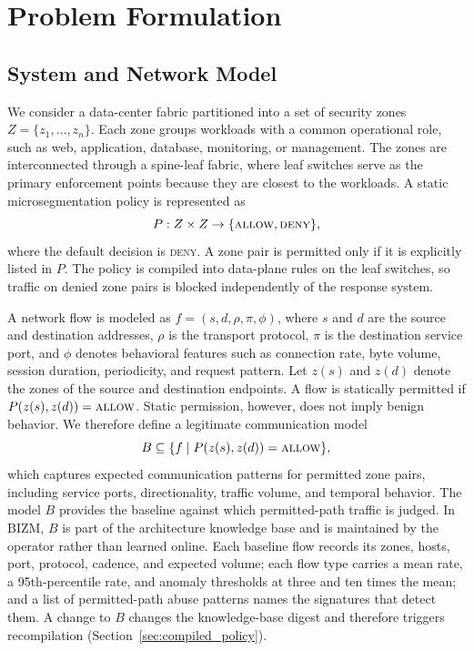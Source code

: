 \documentclass[final,5p]{elsarticle}
\begin{document}
\section{Problem Formulation}
\label{sec:problem}

\subsection{System and Network Model}
\label{sec:system_model}

We consider a data-center fabric partitioned into a set of security zones $Z=\{z_1,\ldots,z_n\}$. Each zone groups workloads with a common operational role, such as web, application, database, monitoring, or management. The zones are interconnected through a spine-leaf fabric, where leaf switches serve as the primary enforcement points because they are closest to the workloads. A static microsegmentation policy is represented as
\[
P: Z \times Z \rightarrow \{\textsc{allow},\textsc{deny}\},
\]
where the default decision is \textsc{deny}. A zone pair is permitted only if it is explicitly listed in $P$. The policy is compiled into data-plane rules on the leaf switches, so traffic on denied zone pairs is blocked independently of the response system.

A network flow is modeled as $f=(s,d,\rho,\pi,\phi)$, where $s$ and $d$ are the source and destination addresses, $\rho$ is the transport protocol, $\pi$ is the destination service port, and $\phi$ denotes behavioral features such as connection rate, byte volume, session duration, periodicity, and request pattern. Let $z(s)$ and $z(d)$ denote the zones of the source and destination endpoints. A flow is statically permitted if $P(z(s),z(d))=\textsc{allow}$. Static permission, however, does not imply benign behavior. We therefore define a legitimate communication model
\[
B \subseteq \{ f \mid P(z(s),z(d))=\textsc{allow}\},
\]
which captures expected communication patterns for permitted zone pairs, including service ports, directionality, traffic volume, and temporal behavior. The model $B$ provides the baseline against which permitted-path traffic is judged. In BIZM, $B$ is part of the architecture knowledge base and is maintained by the operator rather than learned online. Each baseline flow records its zones, hosts, port, protocol, cadence, and expected volume; each flow type carries a mean rate, a 95th-percentile rate, and anomaly thresholds at three and ten times the mean; and a list of permitted-path abuse patterns names the signatures that detect them. A change to $B$ changes the knowledge-base digest and therefore triggers recompilation (Section~\ref{sec:compiled_policy}).
\end{document}
